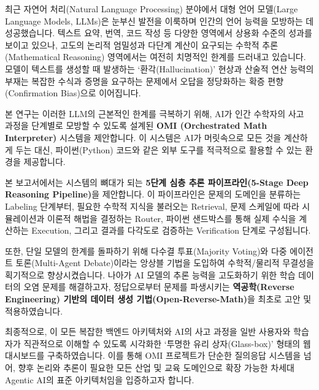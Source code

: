 최근 자연어 처리(Natural Language Processing) 분야에서 대형 언어 모델(Large Language Models, LLMs)은 눈부신 발전을 이룩하며 인간의 언어 능력을 모방하는 데 성공했습니다. 텍스트 요약, 번역, 코드 작성 등 다양한 영역에서 상용화 수준의 성과를 보이고 있으나, 고도의 논리적 엄밀성과 다단계 계산이 요구되는 수학적 추론(Mathematical Reasoning) 영역에서는 여전히 치명적인 한계를 드러내고 있습니다. 모델이 텍스트를 생성할 때 발생하는 `환각(Hallucination)' 현상과 산술적 연산 능력의 부재는 복잡한 수식과 증명을 요구하는 문제에서 오답을 정당화하는 확증 편향(Confirmation Bias)으로 이어집니다.

본 연구는 이러한 LLM의 근본적인 한계를 극복하기 위해, AI가 인간 수학자의 사고 과정을 단계별로 모방할 수 있도록 설계된 \textbf{OMI (Orchestrated Math Interpreter)} 시스템을 제안합니다. 이 시스템은 AI가 머릿속으로 모든 것을 계산하게 두는 대신, 파이썬(Python) 코드와 같은 외부 도구를 적극적으로 활용할 수 있는 환경을 제공합니다. 

본 보고서에서는 시스템의 뼈대가 되는 \textbf{5단계 심층 추론 파이프라인(5-Stage Deep Reasoning Pipeline)}을 제안합니다. 이 파이프라인은 문제의 도메인을 분류하는 Labeling 단계부터, 필요한 수학적 지식을 불러오는 Retrieval, 문제 스케일에 따라 시뮬레이션과 이론적 해법을 결정하는 Router, 파이썬 샌드박스를 통해 실제 수식을 계산하는 Execution, 그리고 결과를 다각도로 검증하는 Verification 단계로 구성됩니다. 

또한, 단일 모델의 한계를 돌파하기 위해 다수결 투표(Majority Voting)와 다중 에이전트 토론(Multi-Agent Debate)이라는 앙상블 기법을 도입하여 수학적/물리적 무결성을 획기적으로 향상시켰습니다. 나아가 AI 모델의 추론 능력을 고도화하기 위한 학습 데이터의 오염 문제를 해결하고자, 정답으로부터 문제를 파생시키는 \textbf{역공학(Reverse Engineering) 기반의 데이터 생성 기법(Open-Reverse-Math)}을 최초로 고안 및 적용하였습니다.

최종적으로, 이 모든 복잡한 백엔드 아키텍처와 AI의 사고 과정을 일반 사용자와 학습자가 직관적으로 이해할 수 있도록 시각화한 `투명한 유리 상자(Glass-box)' 형태의 웹 대시보드를 구축하였습니다. 이를 통해 OMI 프로젝트가 단순한 질의응답 시스템을 넘어, 향후 논리와 추론이 필요한 모든 산업 및 교육 도메인으로 확장 가능한 차세대 Agentic AI의 표준 아키텍처임을 입증하고자 합니다.
